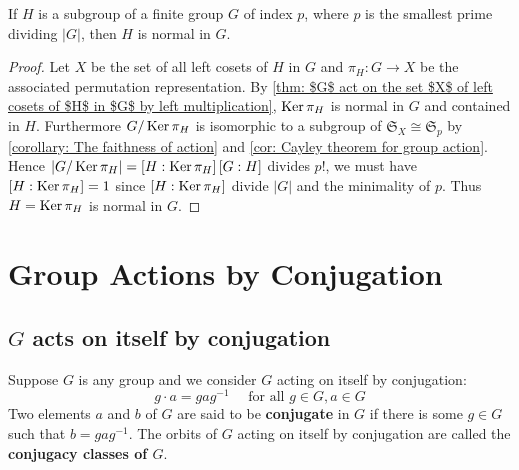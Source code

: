 \begin{corollary}
    If $H$ is a subgroup of a finite group $G$ of index $p$, where $p$ is the smallest prime dividing $\left|G\right|$, then $H$ is normal in $G$.
    \begin{proof}
        Let $X$ be the set of all left cosets of $H$ in $G$ and $\pi_H:G\rightarrow X$ be the associated permutation representation.
        By
        \ref{thm: $G$ act on the set $X$ of left cosets of $H$ in $G$ by left multiplication}, $\operatorname{\operatorname{Ker}} \pi_H$ is normal in $G$ and contained in $H$.
        Furthermore $G / \operatorname{\operatorname{Ker}} \pi_H$ is isomorphic to a subgroup of $\mathfrak{S}_X\cong \mathfrak{S}_p$ by \ref{corollary: The faithness of action} and \ref{cor: Cayley theorem for group action}.
        Hence
        $|G / \operatorname{\operatorname{Ker}} \pi_H|
            =\left[H:\operatorname{\operatorname{Ker}}\pi_H\right]
            \left[ G :H \right]$ divides $p!$, we must have
        $\left[H:\operatorname{\operatorname{Ker}}\pi_H\right]=1$ since $\left[H:\operatorname{\operatorname{Ker}}\pi_H\right]$ divide $\left| G \right|$ and the minimality of $p$.
        Thus $H=\operatorname{\operatorname{Ker}}\pi_H$ is normal in $G$.
    \end{proof}
\end{corollary}





\section{Group Actions by Conjugation}
\subsection{$G$ acts on itself by conjugation}
\begin{definition}
    Suppose $G$ is any group and we  consider $G$ acting on itself by conjugation:
    \begin{equation*}
        g \cdot a=g a g^{-1} \quad \text { for all } g \in G, a \in G
    \end{equation*}
    Two elements $a$ and $b$ of $G$ are said to be \textbf{conjugate} in $G$ if there is some $g \in G$ such that $b=gag^{-1}$.
    The orbits of $G$ acting on itself by conjugation are called the \textbf{conjugacy classes of $G$}.
\end{definition}

